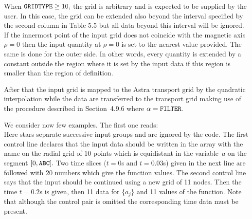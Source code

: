When ${\tt GRIDTYPE}\geq 10,$ the grid is arbitrary and is expected to be 
supplied by the user.
In this case, the grid can be extended also beyond the interval 
specified by the second column in Table 5.5
but all data beyond this interval will be ignored.
If the innermost point of the input grid does not coincide with 
the magnetic axis $\rho=0$ 
then the input quantity at $\rho=0$ is set to the nearest value provided.
The same is done for the outer side.
In other words, every quantity is extended by a constant
outside the region where it is set by the input data 
if this region is smaller than the region of definition.

After that the input grid is mapped to the Astra transport grid by the
quadratic interpolation while the data are transferred to the transport
grid making use of the procedure described in Section~4.9.6 where
$\alpha=\tt FILTER.$ 

We consider now few examples. The first one reads: 
\\
\dl{******}
\dl{******}
\dl{******}
Here stars separate successive input groups and are ignored by the code. 
The first control line declares that the input data should be written in
the array with the name  on the radial grid of 10 points which
is equidistant in the variable~$a$ on the segment $[0,{\tt ABC}].$ 
Two time slices ($t=0$s and $t=0.03$s) given in the next line 
are followed with 20 numbers which give the function values.
The second control line says that the input should be continued
using a new grid of 11 nodes. Then the time $t=0.2$s is given, 
then 11 data for $\{a_j\}$ and 11 values of the function.
Note that although the control pair  is omitted the
corresponding time data must be present.


